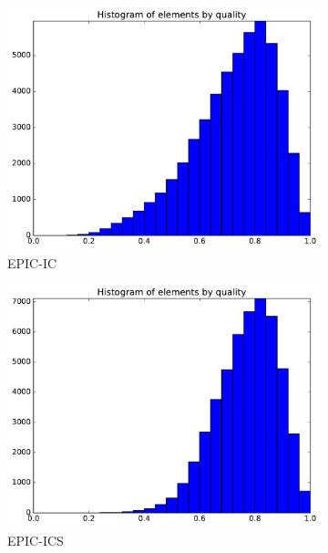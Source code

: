 \documentclass[3p,times,procedia,number]{elsarticle}
\begin{document}
\begin{figure}
\begin{subfigure}{.4\textwidth}
\centering
\includegraphics[width=\textwidth]{epic-ic-cube-linear-quality.pdf}
\caption{EPIC-IC}
\end{subfigure}
\begin{subfigure}{.4\textwidth}
\centering
\includegraphics[width=\textwidth]{epic-ics-cube-linear-quality.pdf}
\caption{EPIC-ICS}
\end{subfigure}
\begin{subfigure}{.4\textwidth}
\centering

\end{subfigure}
\end{figure}
\end{document}

